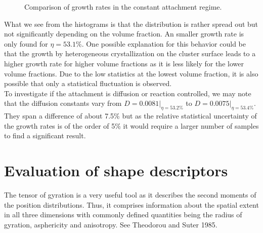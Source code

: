 \begin{figure}[h]
\begin{center}
 \hspace{0.5cm}
\caption[Constant attachment rate measurements from production data]{Comparison of growth rates in the constant attachment regime.}
\label{fig:constant_growth_rates}
\end{center}
\end{figure}

What we see from the histograms is that the distribution is rather spread out but not significantly depending on the volume fraction. An smaller growth rate is only found for $\eta = 53.1\%$. One possible explanation for this behavior could be that the growth by heterogeneous crystallization on the cluster surface leads to a higher growth rate for higher volume fractions as it is less likely for the lower volume fractions. Due to the low statistics at the lowest volume fraction, it is also possible that only a statistical fluctuation is observed.\\ 
To investigate if the attachment is diffusion or reaction controlled, we may note that the diffusion constants vary from $D=0.0081|_{\eta = 53.2\%}$ to $D=0.0075|_{\eta = 53.4\%}$. They span a difference of about 7.5\% but as the relative statistical uncertainty of the growth rates is of the order of 5\% it would require a larger number of samples to find a significant result.

\section{Evaluation of shape descriptors}
\label{sec:tog}
The tensor of gyration is a very useful tool as it describes the second moments of the position distributions. Thus, it comprises information about the spatial extent in all three dimensions with commonly defined quantities being the radius of gyration, asphericity and anisotropy. See Theodorou and Suter 1985\cite{Theodorou1985}.\\

